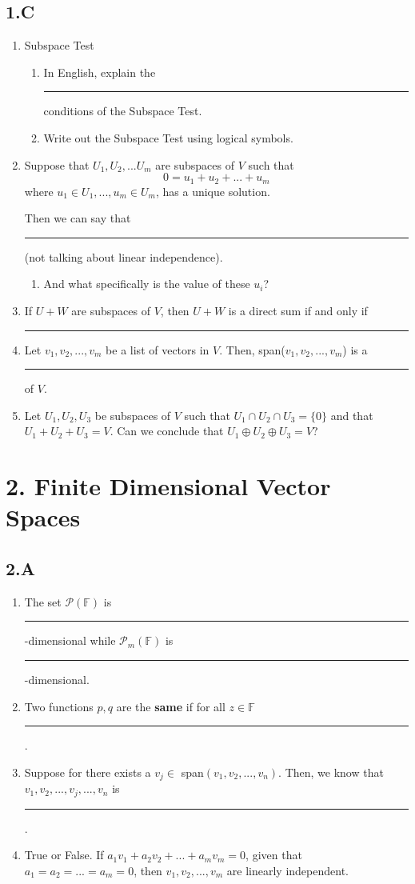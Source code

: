 \documentclass[11pt]{article}
\begin{document}
\subsection*{1.C}
\begin{enumerate}
	\item Subspace Test
	\begin{enumerate}
		\item In English, explain the \rule[0ex]{0.5in}{0.5pt} conditions of the Subspace Test.
		\item Write out the Subspace Test using logical symbols.
	\end{enumerate}
	\item Suppose that $U_1, U_2, ... U_m$ are subspaces of $V$ such that
	\[0 = u_1 + u_2 + ... + u_m \]
	where $u_1 \in U_1, ..., u_m \in U_m$, has a unique solution.
	
	Then we can say that \rule[0ex]{2in}{0.5pt} (not talking about linear independence).
	\begin{enumerate}
		\item And what specifically is the value of these $u_i$?
	\end{enumerate}
	
	\item If $U + W$ are subspaces of $V$, then $U + W$ is a direct sum if and only if \rule[0ex]{1in}{0.5pt}
	
	\item Let $v_1, v_2, ..., v_m$ be a list of vectors in $V$. Then, span($v_1, v_2, ..., v_m$) is a \rule[0ex]{1in}{0.5pt} of $V$.
	
	\item Let $U_1, U_2, U_3$ be subspaces of $V$ such that $U_1 \cap U_2 \cap U_3 = \{0\}$ and that $U_1 + U_2 + U_3 = V$. Can we conclude that $U_1 \oplus U_2 \oplus U_3 = V$?
\end{enumerate}

\section*{2. Finite Dimensional Vector Spaces}
\subsection*{2.A}
\begin{enumerate}
	\item The set $\mathcal{P}(\mathbb{F})$ is \rule[0ex]{1in}{0.5pt}-dimensional while $\mathcal{P}_m(\mathbb{F})$ is \rule[0ex]{1in}{0.5pt}-dimensional.
	
	\item Two functions $p, q$ are the \textbf{same} if for all $z \in \mathbb{F}$ \rule[0ex]{2in}{0.5pt}.
	
	\item Suppose for there exists a $v_j \in$ span$(v_1, v_2, ..., v_n)$. Then, we know that $v_1, v_2, ..., v_j, ..., v_n$ is \rule[0ex]{2in}{0.5pt}.
	
	\item True or False. If $a_1v_1 + a_2v_2 + ... + a_mv_m = 0$, given that $a_1 = a_2 = ... = a_m = 0$, then $v_1, v_2, ..., v_m$ are linearly independent.
\end{enumerate}
\end{document}
